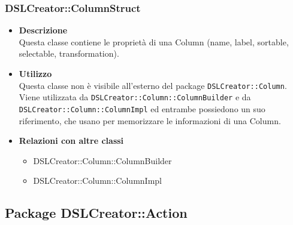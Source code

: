  \subsubsection{DSLCreator::ColumnStruct}
                    \begin{itemize}
                        \item \textbf{Descrizione} \hfill \\
                          Questa classe contiene le proprietà di una Column (name, label, sortable, selectable, transformation).
                        \item \textbf{Utilizzo} \hfill \\
                          Questa classe non è visibile all'esterno del package \texttt{DSLCreator::Column}. Viene utilizzata da \texttt{DSLCreator::Column::ColumnBuilder} e da \texttt{DSLCreator::Column::ColumnImpl} ed entrambe possiedono un suo riferimento, che usano per memorizzare le informazioni di una Column.
                        \item \textbf{Relazioni con altre classi}
                            \begin{itemize}
                              \item DSLCreator::Column::ColumnBuilder
                              \item DSLCreator::Column::ColumnImpl
                            \end{itemize}
                    \end{itemize}  

\subsection{Package DSLCreator::Action}
